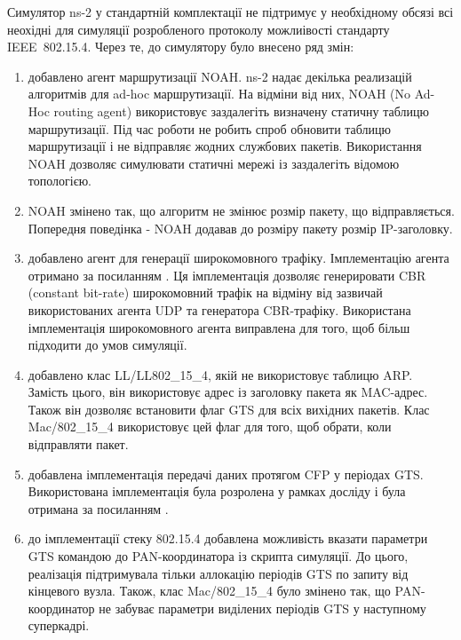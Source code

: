 \documentclass[a4paper,ukrainian,utf8,nocolumnsxix,floatsection,equationsection]{eskdtext}
\newcommand{\iee}[0]{IEEE~802.15.4\xspace}
\begin{document}
Симулятор ns-2 у стандартній комплектації не підтримує у необхідному обсязі всі неохідні для симуляції розробленого протоколу можлиівості стандарту \iee. Через те, до симулятору було внесено ряд змін:

\begin{enumerate}
	\item добавлено агент маршрутизації NOAH. ns-2 надає декілька реализацій алгоритмів для ad-hoc маршрутизації. На відміни від них, NOAH (No Ad-Hoc routing agent) використовує заздалегіть визначену статичну таблицю маршрутизації. Під час роботи не робить спроб обновити таблицю маршрутизації і не відправляє жодних службових пакетів. Використання NOAH дозволяє симулювати статичні мережі із заздалегіть відомою топологією.

	\item NOAH змінено так, що алгоритм не змінює розмір пакету, що відправляється. Попередня поведінка - NOAH додавав до розміру пакету розмір IP-заголовку. 

	\item добавлено агент для генерації широкомовного трафіку. Імплементацію агента отримано за посиланням . Ця імплементація дозволяє генерировати CBR (constant bit-rate) широкомовний трафік на відміну від зазвичай використованих агента UDP та генератора CBR-трафіку. Використана імплементація широкомовного агента виправлена для того, щоб більш підходити до умов симуляції.

	\item добавлено клас LL/LL802\_15\_4, якій не використовує таблицю ARP. Замість цього, він використовує адрес із заголовку пакета як MAC-адрес. Також він дозволяє встановити флаг GTS для всіх вихідних пакетів. Клас Mac/802\_15\_4 використовує цей флаг для того, щоб обрати, коли відправляти пакет. 

	\item добавлена імплементація передачі даних протягом CFP у періодах GTS. Використована імплементація була розролена у рамках досліду  і була отримана за посиланням .

	\item до імплементації стеку 802.15.4 добавлена можливість вказати параметри GTS командою до PAN-координатора із скрипта симуляції. До цього, реалізація підтримувала тільки аллокацію періодів GTS по запиту від кінцевого вузла. Також, клас Mac/802\_15\_4 було змінено так, що PAN-координатор не забуває параметри виділених періодів GTS у наступному суперкадрі.


\end{enumerate}
\end{document}
